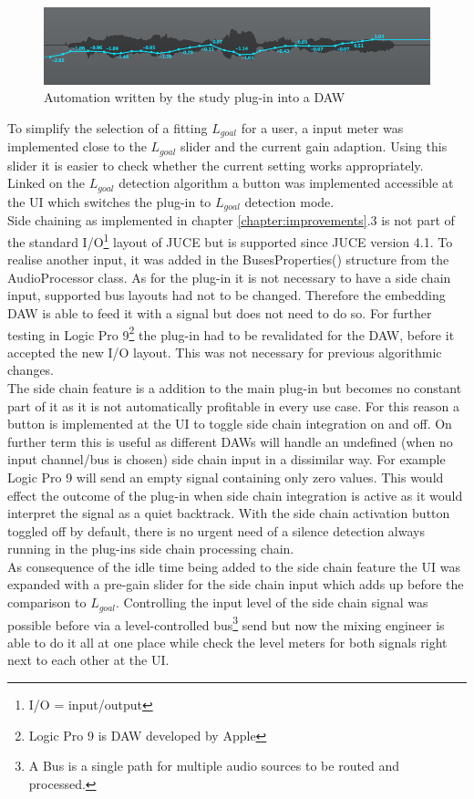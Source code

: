 \begin{figure}[H]
\includegraphics[width=\textwidth]{images/automation}
\caption{Automation written by the study plug-in into a DAW}
\label{auto}
\end{figure}

To simplify the selection of a fitting $L_{goal}$ for a user, a input meter was implemented close to the $L_{goal}$ slider and the current gain adaption. Using this slider it is easier to check whether the current setting works appropriately.\\
Linked on the $L_{goal}$ detection algorithm a button was implemented accessible at the UI which switches the plug-in to $L_{goal}$ detection mode.\\
Side chaining as implemented in chapter \ref{chapter:improvements}.3 is not part of the standard I/O\footnote{I/O = input/output} layout of JUCE but is supported since JUCE version 4.1. To realise another input, it was added in the BusesProperties() structure from the AudioProcessor class. As for the plug-in it is not necessary to have a side chain input, supported bus layouts had not to be changed. Therefore the embedding DAW is able to feed it with a signal but does not need to do so. For further testing in Logic Pro 9\footnote{Logic Pro 9 is DAW developed by Apple} the plug-in had to be revalidated for the DAW, before it accepted the new I/O layout. This was not necessary for previous algorithmic changes.\\
The side chain feature is a addition to the main plug-in but becomes no constant part of it as it is not automatically profitable in every use case. For this reason a button is implemented at the UI to toggle side chain integration on and off. On further term this is useful as different DAWs will handle an undefined (when no input channel/bus is chosen) side chain input in a dissimilar way. For example Logic Pro 9 will send an empty signal containing only zero values. This would effect the outcome of the plug-in when side chain integration is active as it would interpret the signal as a quiet backtrack. With the side chain activation button toggled off by default, there is no urgent need of a silence detection always running in the plug-ins side chain processing chain.\\
As consequence of the idle time being added to the side chain feature the UI was expanded with a pre-gain slider for the side chain input which adds up before the comparison to $L_{goal}$. Controlling the input level of the side chain signal was possible before via a level-controlled bus\footnote{A Bus is a single path for multiple audio sources to be routed and processed.} send but now the mixing engineer is able to do it all at one place while check the level meters for both signals right next to each other at the UI. 

